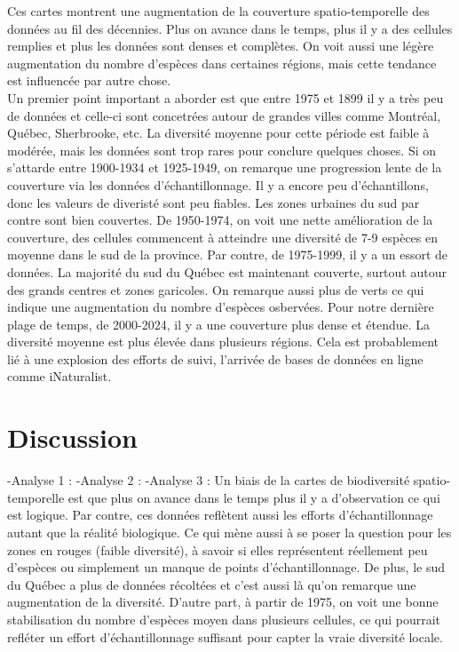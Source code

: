 \documentclass[9pt,twocolumn,twoside,]{pnas-new}
\begin{document}
Ces cartes montrent une augmentation de la couverture spatio-temporelle
des données au fil des décennies. Plus on avance dans le temps, plus il
y a des cellules remplies et plus les données sont denses et complètes.
On voit aussi une légère augmentation du nombre d'espèces dans certaines
régions, mais cette tendance est influencée par autre chose.\\
Un premier point important a aborder est que entre 1975 et 1899 il y a
très peu de données et celle-ci sont concetrées autour de grandes villes
comme Montréal, Québec, Sherbrooke, etc. La diversité moyenne pour cette
période est faible à modérée, mais les données sont trop rares pour
conclure quelques choses. Si on s'attarde entre 1900-1934 et 1925-1949,
on remarque une progression lente de la couverture via les données
d'échantillonnage. Il y a encore peu d'échantillons, donc les valeurs de
diveristé sont peu fiables. Les zones urbaines du sud par contre sont
bien couvertes. De 1950-1974, on voit une nette amélioration de la
couverture, des cellules commencent à atteindre une diversité de 7-9
espèces en moyenne dans le sud de la province. Par contre, de 1975-1999,
il y a un essort de données. La majorité du sud du Québec est maintenant
couverte, surtout autour des grands centres et zones garicoles. On
remarque aussi plus de verts ce qui indique une augmentation du nombre
d'espèces osbervées. Pour notre dernière plage de temps, de 2000-2024,
il y a une couverture plus dense et étendue. La diversité moyenne est
plus élevée dans plusieurs régions. Cela est probablement lié à une
explosion des efforts de suivi, l'arrivée de bases de données en ligne
comme iNaturalist.

\section{Discussion}\label{discussion}

-Analyse 1 : -Analyse 2 : -Analyse 3 : Un biais de la cartes de
biodiversité spatio-temporelle est que plus on avance dans le temps plus
il y a d'observation ce qui est logique. Par contre, ces données
reflètent aussi les efforts d'échantillonnage autant que la réalité
biologique. Ce qui mène aussi à se poser la question pour les zones en
rouges (faible diversité), à savoir si elles représentent réellement peu
d'espèces ou simplement un manque de points d'échantillonnage. De plus,
le sud du Québec a plus de données récoltées et c'est aussi là qu'on
remarque une augmentation de la diversité. D'autre part, à partir de
1975, on voit une bonne stabilisation du nombre d'espèces moyen dans
plusieurs cellules, ce qui pourrait refléter un effort d'échantillonnage
suffisant pour capter la vraie diversité locale.
\end{document}
